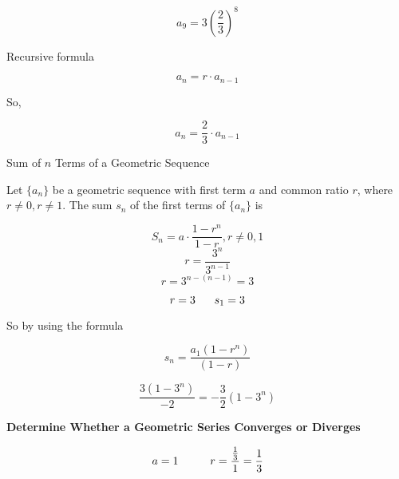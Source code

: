 \documentclass{report}
\begin{document}
$$a_9 = 3\left(\frac{2}{3}\right)^8$$
\vspace{3mm}

Recursive formula

$$a_n = r \cdot a_{n-1}$$

So,

$$a_n = \frac{2}{3} \cdot a_{n-1}$$
\bigbreak \noindent \bigbreak \noindent \bigbreak \noindent
\begin{large}
Sum of $n$ Terms of a Geometric Sequence
\end{large}
\bigbreak \noindent
Let $\{a_n\}$ be a geometric sequence with first term $a$ and common ratio $r$, where $r \neq 0, r \neq 1$. The sum $s_n$ of the first terms of $\{a_ n\}$ is

$$S_n=a \cdot \frac{1-r^n}{1-r}, r \neq 0,1$$
\bigbreak \noindent
{}
$$ r = \frac{3^n}{3^{n-1}}$$
$$ r = 3^{n-(n-1)} = 3$$

$$ r = 3 \hspace{6mm} s_1 = 3$$

So by using the formula

$$
s_n=\frac{a_1\left(1-r^n\right)}{(1-r)}
$$

$$\frac{3(1-3^n)}{-2} = \boxed{-\frac{3}{2}\left(1-3^n\right)}$$

\pagebreak
\noindent \begin{large}
	\textbf{Determine Whether a Geometric Series Converges or Diverges} 
\end{large}
\bigbreak \noindent
{}
\bigbreak \noindent \bigbreak \noindent
{}
$$ a = 1 \hspace{10mm} r = \frac{\frac{1}{3}}{1} = \frac{1}{3}$$
\end{document}
